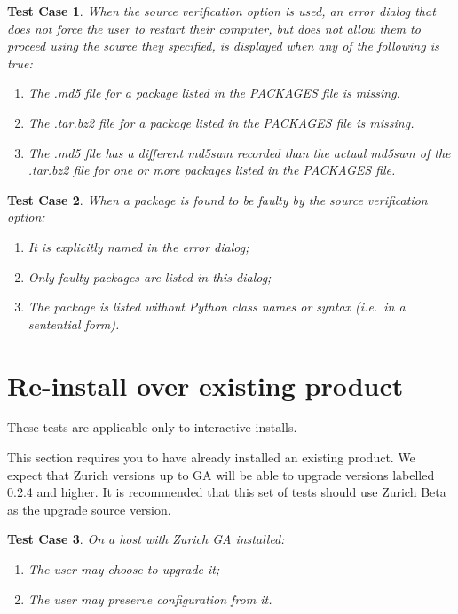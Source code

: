 \documentclass[a4paper]{article}
\newtheorem{testcase}{Test Case}
\begin{document}
\begin{testcase}
When the source verification option is used, an error dialog that does
not force the user to restart their computer, but does not allow them
to proceed using the source they specified, is displayed when any of
the following is true:
\begin{enumerate}
\item The .md5 file for a package listed in the PACKAGES file is
  missing.
\item The .tar.bz2 file for a package listed in the PACKAGES file is
  missing.
\item The .md5 file has a different md5sum recorded than the actual
  md5sum of the .tar.bz2 file for one or more packages listed in the
  PACKAGES file.
\end{enumerate}
\end{testcase}

\begin{testcase}
When a package is found to be faulty by the source verification
option:
\begin{enumerate}
\item It is explicitly named in the error dialog;
\item Only faulty packages are listed in this dialog;
\item The package is listed without Python class names or syntax
(i.e.\ in a sentential form).
\end{enumerate}
\end{testcase}

\section{Re-install over existing product}

These tests are applicable only to interactive installs.

This section requires you to have already installed an existing
product.  We expect that Zurich versions up to GA will be able to
upgrade versions labelled 0.2.4 and higher.  It is recommended that
this set of tests should use Zurich Beta as the upgrade source version.

\begin{testcase}
On a host with Zurich GA installed:
\begin{enumerate}
\item The user may choose to upgrade it;
\item The user may preserve configuration from it.
\end{enumerate}
\end{testcase}
\end{document}
